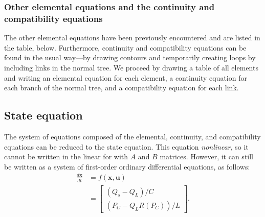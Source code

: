 \documentclass[dynamic_systems.tex]{subfiles}
\begin{document}
\subsubsection{Other elemental equations and the continuity and compatibility equations}
\tags{}

The other elemental equations have been previously encountered and are listed in the table, below. 
Furthermore, continuity and compatibility equations can be found in the usual way---by drawing contours and temporarily creating loops by including links in the normal tree.
We proceed by drawing a table of all elements and writing an elemental equation for each element, a continuity equation for each branch of the normal tree, and a compatibility equation for each link.
\tags{}

\begingroup
\renewcommand*{\arraystretch}{2}
\begin{center}
\qquad\qquad
{}
\end{center}
\endgroup

\subsection{State equation}
\tags{}

The system of equations composed of the elemental, continuity, and compatibility equations can be reduced to the state equation. 
This equation \emph{nonlinear}, so it cannot be written in the linear for with $A$ and $B$ matrices.
However, it can still be written as a system of first-order ordinary differential equations, as follows:
\tags{}
\begin{align}
\frac{d \bm{x}}{d t} &= f(\bm{x},\bm{u}) \nonumber \\
&= 
\begin{bmatrix}
  (Q_s - Q_L)/C \\
  (P_C - Q_L R(P_C))/L
\end{bmatrix}
. \label{eq:nonlinear_fluid_example_state}
\end{align}
\end{document}
